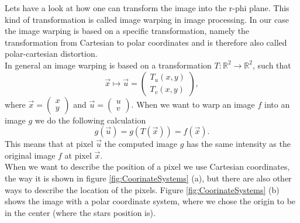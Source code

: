 Lets have a look at how one can transform the image into the r-phi plane. This kind of transformation is called image warping in image processing. In our case the image warping is based on a specific transformation, namely the transformation from Cartesian to polar coordinates and is therefore also called polar-cartesian distortion.\\
In general an image warping is based on a transformation $T: \mathbb{R}^2 \rightarrow \mathbb{R}^2$, such that 
\begin{equation}
	\vec{x} \mapsto \vec{u} = \begin{pmatrix} T_u(x,y) \\ T_v(x,y) \end{pmatrix},
\end{equation}
where $\vec{x} = \begin{pmatrix} x \\ y \end{pmatrix}$ and $\vec{u} = \begin{pmatrix} u \\ v \end{pmatrix}$. When we want to warp an image $f$ into an image $g$ we do the following calculation
\begin{equation}
	g(\vec{u}) = g(T(\vec{x})) = f(\vec{x}).
\end{equation}
This means that at pixel $\vec{u}$ the computed image $g$ has the same intensity as the original image $f$ at pixel $\vec{x}$. \cite{ImageWarping}\\
When we want to describe the position of a pixel we use Cartesian coordinates, the way it is shown in figure \ref{fig:CoorinateSystems} (a), but there are also other ways to describe the location of the pixels. Figure \ref{fig:CoorinateSystems} (b) shows the image with a polar coordinate system, where we chose the origin to be in the center (where the stars position is).
